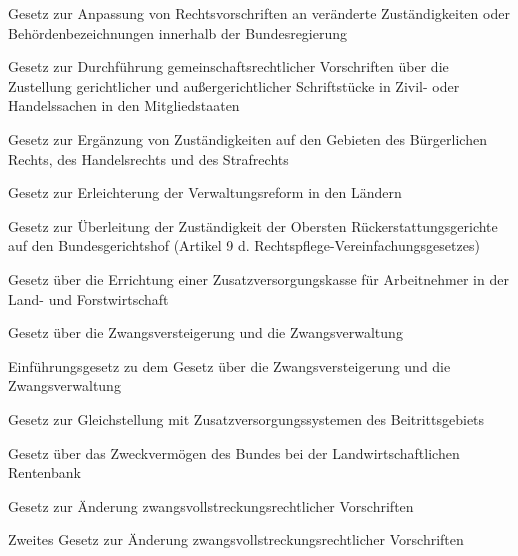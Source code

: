 \item[{ZustAnpG-2002}] Gesetz zur Anpassung von Rechtsvorschriften an veränderte Zuständigkeiten oder Behördenbezeichnungen innerhalb der Bundesregierung

\item[{ZustDG}] Gesetz zur Durchführung gemeinschaftsrechtlicher Vorschriften über die Zustellung gerichtlicher und außergerichtlicher Schriftstücke in Zivil- oder Handelssachen in den Mitgliedstaaten

\item[{ZustErgG}] Gesetz zur Ergänzung von Zuständigkeiten auf den Gebieten des Bürgerlichen Rechts, des Handelsrechts und des Strafrechts

\item[{ZustLG}] Gesetz zur Erleichterung der Verwaltungsreform in den Ländern

\item[{ZustÜblG}] Gesetz zur Überleitung der Zuständigkeit der Obersten Rückerstattungsgerichte auf den Bundesgerichtshof (Artikel 9 d. Rechtspflege-Vereinfachungsgesetzes)

\item[{ZVALG}] Gesetz über die Errichtung einer Zusatzversorgungskasse für Arbeitnehmer in der Land- und Forstwirtschaft

\item[{ZVG}] Gesetz über die Zwangsversteigerung und die Zwangsverwaltung

\item[{ZVGEG}] Einführungsgesetz zu dem Gesetz über die Zwangsversteigerung und die Zwangsverwaltung

\item[{ZVsG}] Gesetz zur Gleichstellung mit Zusatzversorgungssystemen des Beitrittsgebiets

\item[{ZweckVG}] Gesetz über das Zweckvermögen des Bundes bei der Landwirtschaftlichen Rentenbank

\item[{ZwVollstrRÄndG}] Gesetz zur Änderung zwangsvollstreckungsrechtlicher Vorschriften

\item[{ZwVollstrRÄndG-2}] Zweites Gesetz zur Änderung zwangsvollstreckungsrechtlicher Vorschriften

